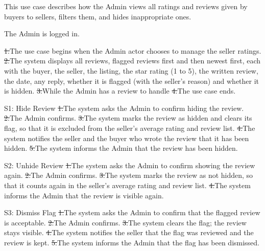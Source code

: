 This use case describes how the Admin views all ratings and reviews given by buyers to sellers, filters them, and hides inappropriate ones.\par
{}
The Admin is logged in.\par
{}
\st{1.}{The use case begins when the Admin actor chooses to manage the seller ratings.}
\st{2.}{The system displays all reviews, flagged reviews first and then newest first, each with the buyer, the seller, the listing, the star rating (1 to 5), the written review, the date, any reply, whether it is flagged (with the seller's reason) and whether it is hidden.}
\st{3.}{While the Admin has a review to handle}
\st{4.}{The use case ends.}
\begin{flowblock}{S1: Hide Review}
\st{1.}{The system asks the Admin to confirm hiding the review.}
\st{2.}{The Admin confirms.}
\st{3.}{The system marks the review as hidden and clears its flag, so that it is excluded from the seller's average rating and review list.}
\st{4.}{The system notifies the seller and the buyer who wrote the review that it has been hidden.}
\st{5.}{The system informs the Admin that the review has been hidden.}
\end{flowblock}
\begin{flowblock}{S2: Unhide Review}
\st{1.}{The system asks the Admin to confirm showing the review again.}
\st{2.}{The Admin confirms.}
\st{3.}{The system marks the review as not hidden, so that it counts again in the seller's average rating and review list.}
\st{4.}{The system informs the Admin that the review is visible again.}
\end{flowblock}
\begin{flowblock}{S3: Dismiss Flag}
\st{1.}{The system asks the Admin to confirm that the flagged review is acceptable.}
\st{2.}{The Admin confirms.}
\st{3.}{The system clears the flag; the review stays visible.}
\st{4.}{The system notifies the seller that the flag was reviewed and the review is kept.}
\st{5.}{The system informs the Admin that the flag has been dismissed.}
\end{flowblock}
